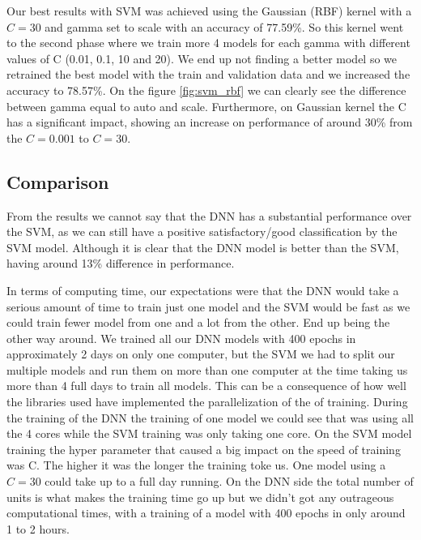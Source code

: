 \documentclass[journal, a4paper]{IEEEtran}
\begin{document}
    Our best results with SVM was achieved using the Gaussian (RBF) kernel with a \(C=30\) and gamma
set to scale with an accuracy of 77.59\%. So this kernel went to the second phase where we train more 4 models for each gamma
with different values of C (0.01, 0.1, 10 and 20). We end up not finding a better model so we retrained
the best model with the train and validation data and we increased the accuracy to 78.57\%. On the
figure \ref{fig:svm_rbf} we can clearly see the difference between gamma equal to auto and scale. Furthermore, on
Gaussian kernel the C has a significant impact, showing an increase on performance of around 30\% from the
\(C=0.001\) to \(C=30\).

    \subsection{Comparison}
    From the results we cannot say that the DNN has a substantial performance over the SVM, as we can still have a positive
satisfactory/good classification by the SVM model. Although it is clear that the DNN model is better than
the SVM, having around 13\% difference in performance.

    In terms of computing time, our expectations were that the DNN would take a serious amount of time to train
just one model and the SVM would be fast as we could train fewer model from one and a lot from the other.
End up being the other way around. We trained all our DNN models with 400 epochs in approximately 2 days
on only one computer, but the SVM we had to split our multiple models and run them on more than one computer
at the time taking us more than 4 full days to train all models. This can be a consequence of how well
the libraries used have implemented the parallelization of the of training. During the training of the DNN
the training of one model we could see that was using all the 4 cores while the SVM training was only taking
one core. On the SVM model training the hyper parameter that caused a big impact on the speed of training
was C. The higher it was the longer the training toke us. One model using a \(C=30\) could take up to
a full day running. On the DNN side the total number of units is what makes the training time go up but
we didn't got any outrageous computational times, with a training of a model with 400 epochs in only around
1 to 2 hours.
\end{document}
